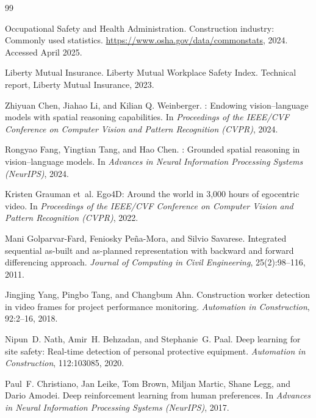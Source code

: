 \documentclass[sigconf,nonacm]{acmart}
\begin{document}
\begin{thebibliography}{99}

{Occupational Safety and Health Administration}.
\newblock Construction industry: Commonly used statistics.
\newblock \url{https://www.osha.gov/data/commonstats}, 2024.
\newblock Accessed April 2025.

{Liberty Mutual Insurance}.
 Liberty Mutual Workplace Safety Index.
\newblock Technical report, Liberty Mutual Insurance, 2023.


Zhiyuan Chen, Jiahao Li, and Kilian Q. Weinberger.
: Endowing vision--language models with spatial reasoning
  capabilities.
\newblock In \emph{Proceedings of the IEEE/CVF Conference on Computer Vision
  and Pattern Recognition (CVPR)}, 2024.

Rongyao Fang, Yingtian Tang, and Hao Chen.
: Grounded spatial reasoning in vision--language models.
\newblock In \emph{Advances in Neural Information Processing Systems
  (NeurIPS)}, 2024.

Kristen Grauman et~al.
\newblock Ego4{D}: Around the world in 3,000 hours of egocentric video.
\newblock In \emph{Proceedings of the IEEE/CVF Conference on Computer Vision
  and Pattern Recognition (CVPR)}, 2022.

Mani Golparvar-Fard, Feniosky Pe\~{n}a-Mora, and Silvio Savarese.
\newblock Integrated sequential as-built and as-planned representation with
  backward and forward differencing approach.
\newblock \emph{Journal of Computing in Civil Engineering}, 25(2):98--116,
  2011.

Jingjing Yang, Pingbo Tang, and Changbum Ahn.
\newblock Construction worker detection in video frames for project
  performance monitoring.
\newblock \emph{Automation in Construction}, 92:2--16, 2018.

Nipun~D. Nath, Amir~H. Behzadan, and Stephanie~G. Paal.
\newblock Deep learning for site safety: Real-time detection of personal
  protective equipment.
\newblock \emph{Automation in Construction}, 112:103085, 2020.

Paul~F. Christiano, Jan Leike, Tom Brown, Miljan Martic, Shane Legg, and
  Dario Amodei.
\newblock Deep reinforcement learning from human preferences.
\newblock In \emph{Advances in Neural Information Processing Systems
  (NeurIPS)}, 2017.


\end{thebibliography}
\end{document}
